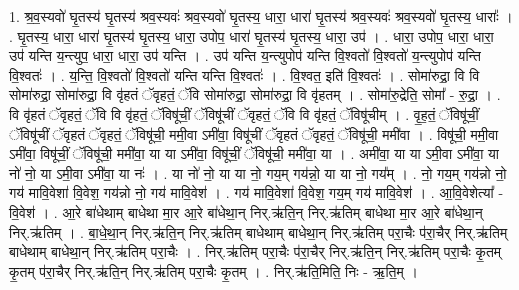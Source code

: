 \documentclass[17pt]{extarticle}
\begin{document}
1. श्र॒व॒स्यवो॑ घृ॒तस्य॑ घृ॒तस्य॑ श्रव॒स्यवः॑ श्रव॒स्यवो॑ घृ॒तस्य॒ धारा॒ धारा॑ घृ॒तस्य॑ श्रव॒स्यवः॑ श्रव॒स्यवो॑ घृ॒तस्य॒ धाराः᳚ । . घृ॒तस्य॒ धारा॒ धारा॑ घृ॒तस्य॑ घृ॒तस्य॒ धारा॒ उपोप॒ धारा॑ घृ॒तस्य॑ घृ॒तस्य॒ धारा॒ उप॑ । . धारा॒ उपोप॒ धारा॒ धारा॒ उप॑ यन्ति य॒न्त्युप॒ धारा॒ धारा॒ उप॑ यन्ति । . उप॑ यन्ति य॒न्त्युपोप॑ यन्ति वि॒श्वतो॑ वि॒श्वतो॑ य॒न्त्युपोप॑ यन्ति वि॒श्वतः॑ । . य॒न्ति॒ वि॒श्वतो॑ वि॒श्वतो॑ यन्ति यन्ति वि॒श्वतः॑ । . वि॒श्वत॒ इति॑ वि॒श्वतः॑ । . सोमा॑रुद्रा॒ वि वि सोमा॑रुद्रा॒ सोमा॑रुद्रा॒ वि वृ॑हतं ॅवृहतं॒ ॅवि सोमा॑रुद्रा॒ सोमा॑रुद्रा॒ वि वृ॑हतम् । . सोमा॑रु॒द्रेति॒ सोमा᳚ - रु॒द्रा॒ । . वि वृ॑हतं ॅवृहतं॒ ॅवि वि वृ॑हतं॒ ॅविषू॑चीं॒ ॅविषू॑चीं ॅवृहतं॒ ॅवि वि वृ॑हतं॒ ॅविषू॑चीम् । . वृ॒ह॒तं॒ ॅविषू॑चीं॒ ॅविषू॑चीं ॅवृहतं ॅवृहतं॒ ॅविषू॑ची॒ ममी॒वा ऽमी॑वा॒ विषू॑चीं ॅवृहतं ॅवृहतं॒ ॅविषू॑ची॒ ममी॑वा । . विषू॑ची॒ ममी॒वा ऽमी॑वा॒ विषू॑चीं॒ ॅविषू॑ची॒ ममी॑वा॒ या या ऽमी॑वा॒ विषू॑चीं॒ ॅविषू॑ची॒ ममी॑वा॒ या । . अमी॑वा॒ या या ऽमी॒वा ऽमी॑वा॒ या नो॑ नो॒ या ऽमी॒वा ऽमी॑वा॒ या नः॑ । . या नो॑ नो॒ या या नो॒ गय॒म् गय॑न्नो॒ या या नो॒ गय᳚म् । . नो॒ गय॒म् गय॑न्नो नो॒ गय॑ मावि॒वेशा॑ वि॒वेश॒ गय॑न्नो नो॒ गय॑ मावि॒वेश॑ । . गय॑ मावि॒वेशा॑ वि॒वेश॒ गय॒म् गय॑ मावि॒वेश॑ । . आ॒वि॒वेशेत्या᳚ - वि॒वेश॑ । . आ॒रे बा॑धेथाम् बाधेथा मा॒र आ॒रे बा॑धेथा॒न् निर्.ऋ॑ति॒न् निर्.ऋ॑तिम् बाधेथा मा॒र आ॒रे बा॑धेथा॒न् निर्.ऋ॑तिम् । . बा॒धे॒था॒न् निर्.ऋ॑ति॒न् निर्.ऋ॑तिम् बाधेथाम् बाधेथा॒न् निर्.ऋ॑तिम् परा॒चैः प॑रा॒चैर् निर्.ऋ॑तिम् बाधेथाम् बाधेथा॒न् निर्.ऋ॑तिम् परा॒चैः । . निर्.ऋ॑तिम् परा॒चैः प॑रा॒चैर् निर्.ऋ॑ति॒न् निर्.ऋ॑तिम् परा॒चैः कृ॒तम् कृ॒तम् प॑रा॒चैर् निर्.ऋ॑ति॒न् निर्.ऋ॑तिम् परा॒चैः कृ॒तम् । . निर्.ऋ॑ति॒मिति॒ निः - ऋ॒ति॒म् । \newline
\end{document}
